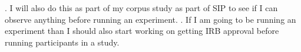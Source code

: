 \documentclass[12pt, letterpaper]{article}
\begin{document}
\ex. I will also do this as part of my corpus study as part of SIP to see if I can observe anything before running an experiment. 
\a. If I am going to be running an experiment than I should also start working on getting IRB approval before running participants in a study.


\printbibliography

\end{document}
